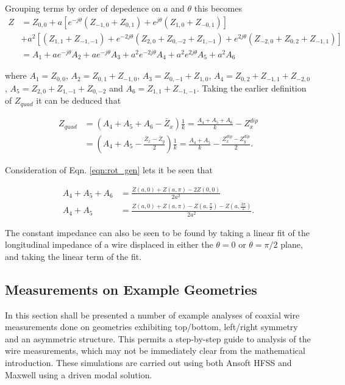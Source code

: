 Grouping terms by order of depedence on $a$ and $\theta$ this becomes
\begin{align}
Z   &=Z_{0,0} + a\left[ e^{-j\theta}\left( Z_{-1,0} + Z_{0,1} \right) +  e^{j\theta}\left( Z_{1,0} + Z_{-0,1} \right)\right] \nonumber \\
     &+a^{2}\left[ \left( Z_{1,1} + Z_{-1,-1} \right) + e^{-2j\theta} \left(  Z_{2,0} + Z_{0,-2} +Z_{1,-1} \right) + e^{2j\theta} \left( Z_{-2,0} + Z_{0,2} +Z_{-1,1} \right) \right] \nonumber \\
     &=A_{1} + ae^{-j\theta}A_{2} + ae^{-j\theta}A_{3}+ a^{2}e^{-2j\theta}A_{4} +a^{2}e^{2j\theta}A_{5} +  a^{2}A_{6}
\label{eqn:rot_gen}
\end{align}

where $A_{1} = Z_{0,0}$, $A_{2} = Z_{0,1}+Z_{-1,0}$, $A_{3} = Z_{0,-1}+Z_{1,0}$, $A_{4} = Z_{0,2}+Z_{-1,1}+Z_{-2,0}$, $A_{5} = Z_{2,0}+Z_{1,-1}+Z_{0,-2}$ and $A_{6}=Z_{1,1}+Z_{-1,-1}$. Taking the earlier definition of $Z_{quad}$ it can be deduced that

\begin{align}
Z_{quad} & = \left( A_{4}+A_{5}+A_{6} - \bar{Z}_{x} \right)\frac{1}{k} =\frac{ A_{4}+A_{5}+A_{6}}{k} - Z^{dip}_{x} \\  
	    & = \left( A_{4}+A_{5} - \frac{\bar{Z}_{x}- \bar{Z}_{y}}{2}\right)\frac{1}{k} =\frac{ A_{4}+A_{5}}{k} - \frac{Z^{dip}_{x}-Z^{dip}_{y} }{2}.
\end{align}

Consideration of Eqn. \ref{eqn:rot_gen} lets it be seen that

\begin{align}
 A_{4}+A_{5}+A_{6} & = \frac{Z\left( a,0 \right)+Z\left( a,\pi \right) - 2Z\left( 0,0 \right)}{2a^{2}} \\
 A_{4}+A_{5} & = \frac{Z\left( a,0 \right)+Z\left( a,\pi \right) - Z\left( a,\frac{\pi}{2} \right)-Z\left( a,\frac{3\pi}{2} \right)}{2a^{2}}.
\end{align}

The constant impedance can also be seen to be found by taking a linear fit of the longitudinal impedance of a wire displaced in either the $\theta = 0$ or $\theta = \pi / 2$ plane, and taking the linear term of the fit. 

\subsection{Measurements on Example Geometries}

In this section shall be presented a number of example analyses of coaxial wire measurements done on geometries exhibiting top/bottom, left/right symmetry and an asymmetric structure. This permits a step-by-step guide to analysis of the wire measurements, which may not be immediately clear from the mathematical introduction. These simulations are carried out using both Ansoft HFSS\cite{hfss} and Maxwell\cite{maxwell} using a driven modal solution. 

